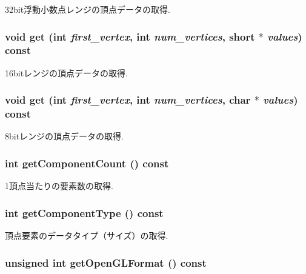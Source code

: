 32bit浮動小数点レンジの頂点データの取得. \hypertarget{classm3g_1_1VertexArray_575822f60d7b5e74ed51e94851123038}{
\subsubsection[{get}]{\setlength{\rightskip}{0pt plus 5cm}void get (int {\em first\_\-vertex}, \/  int {\em num\_\-vertices}, \/  short $\ast$ {\em values}) const}}
\label{classm3g_1_1VertexArray_575822f60d7b5e74ed51e94851123038}


16bitレンジの頂点データの取得. \hypertarget{classm3g_1_1VertexArray_9d1b801a7c196a07553a5ef4a5473573}{
\subsubsection[{get}]{\setlength{\rightskip}{0pt plus 5cm}void get (int {\em first\_\-vertex}, \/  int {\em num\_\-vertices}, \/  char $\ast$ {\em values}) const}}
\label{classm3g_1_1VertexArray_9d1b801a7c196a07553a5ef4a5473573}


8bitレンジの頂点データの取得. \hypertarget{classm3g_1_1VertexArray_7016f51d2788e78fdd736efd040f5e5e}{
\subsubsection[{getComponentCount}]{\setlength{\rightskip}{0pt plus 5cm}int getComponentCount () const}}
\label{classm3g_1_1VertexArray_7016f51d2788e78fdd736efd040f5e5e}


1頂点当たりの要素数の取得. \hypertarget{classm3g_1_1VertexArray_9b7b78fbff0603779ec6bdd2a323c939}{
\subsubsection[{getComponentType}]{\setlength{\rightskip}{0pt plus 5cm}int getComponentType () const}}
\label{classm3g_1_1VertexArray_9b7b78fbff0603779ec6bdd2a323c939}


頂点要素のデータタイプ（サイズ）の取得. \hypertarget{classm3g_1_1VertexArray_3e28ae5596cde78a980de02005a136f2}{
\subsubsection[{getOpenGLFormat}]{\setlength{\rightskip}{0pt plus 5cm}unsigned int getOpenGLFormat () const}}
\label{classm3g_1_1VertexArray_3e28ae5596cde78a980de02005a136f2}


